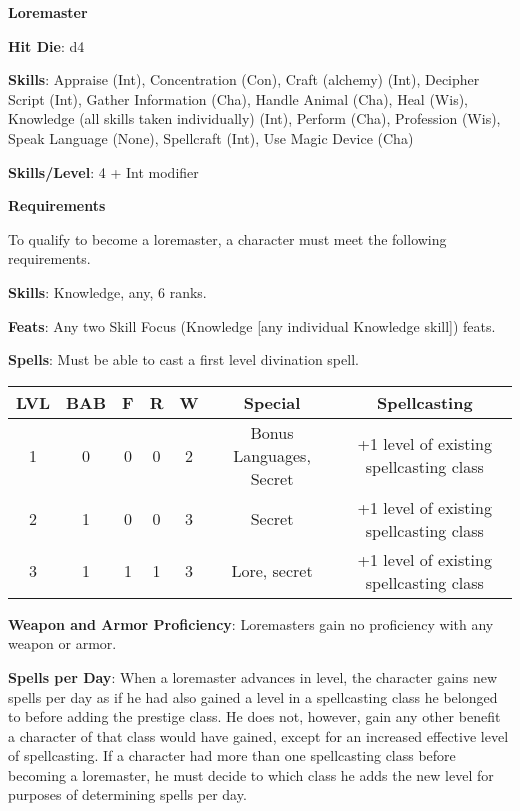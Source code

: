 \textbf{\huge{Loremaster}}

\textbf{Hit Die}: d4

\textbf{Skills}: Appraise (Int), Concentration (Con), Craft (alchemy) (Int), Decipher Script (Int), Gather Information (Cha), Handle Animal (Cha), Heal (Wis), Knowledge (all skills taken individually) (Int), Perform (Cha), Profession (Wis), Speak Language (None), Spellcraft (Int), Use Magic Device (Cha)

\textbf{Skills/Level}: 4 + Int modifier

\textbf{\large{Requirements}}

To qualify to become a loremaster, a character must meet the following requirements.

\textbf{Skills}: Knowledge, any, 6 ranks.

\textbf{Feats}: Any two Skill Focus (Knowledge [any individual Knowledge skill]) feats.

\textbf{Spells}: Must be able to cast a first level divination spell.

\begin{center}
\begin{adjustwidth}{-4cm}{}
\begin{small}
\begin{tabular}{| c | c | c | c | c | c | c |}
\hline
LVL &BAB &F &R &W &Special &Spellcasting \\
\hline
1 &0 &0 &0 &2 &Bonus Languages, Secret &+1 level of existing spellcasting class \\
2 &1 &0 &0 &3 &Secret &+1 level of existing spellcasting class \\
3 &1 &1 &1 &3 &Lore, secret &+1 level of existing spellcasting class \\
\hline
\end{tabular}
\end{small}
\end{adjustwidth}
\end{center}

\textbf{Weapon and Armor Proficiency}: Loremasters gain no proficiency with any weapon or armor.

\textbf{Spells per Day}: When a loremaster advances in level, the character gains new spells per day as if he had also gained a level in a spellcasting class he belonged to before adding the prestige class. He does not, however, gain any other benefit a character of that class would have gained, except for an increased effective level of spellcasting. If a character had more than one spellcasting class before becoming a loremaster, he must decide to which class he adds the new level for purposes of determining spells per day.


